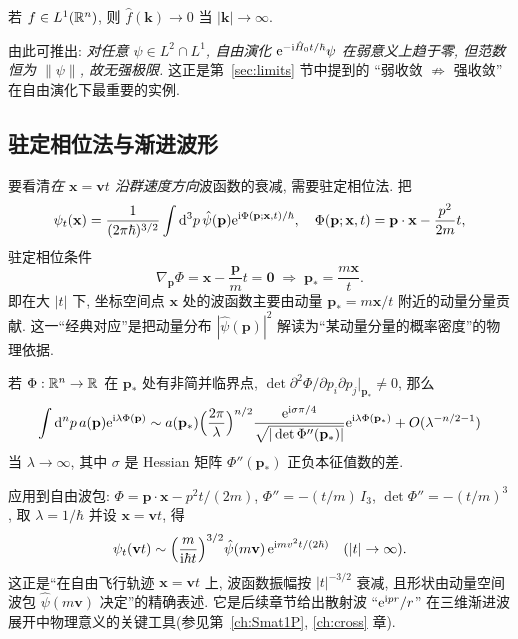 \begin{theorem}\label{thm:qm-riemann-lebesgue}
若 $f\in L^{1}(\mathbb{R}^{n})$, 则 $\hat f(\mathbf k)\to 0$ 当 $|\mathbf k|\to\infty$.
\end{theorem}

由此可推出: \emph{对任意 $\psi\in L^{2}\cap L^{1}$, 自由演化 $\mathrm{e}^{-\mathrm{i}\hat{H}_0 t/\hbar}\psi$ 在弱意义上趋于零, 但范数恒为 $\|\psi\|$, 故无强极限.} 这正是第~\ref{sec:limits} 节中提到的 ``弱收敛 $\not\Rightarrow$ 强收敛'' 在自由演化下最重要的实例.

\subsection{驻定相位法与渐进波形}\label{subsec:qm-stationary-phase}

要看清\emph{在 $\mathbf x=\mathbf v t$ 沿群速度方向}波函数的衰减, 需要驻定相位法. 把
\begin{equation}
\psi_{t}(\mathbf x)=\frac{1}{(2\pi\hbar)^{3/2}}\int\mathrm{d}^{3}p\,\hat\psi(\mathbf p)\mathrm{e}^{\mathrm{i}\Phi(\mathbf p;\mathbf x,t)/\hbar},\quad
\Phi(\mathbf p;\mathbf x,t)=\mathbf p\cdot\mathbf x-\frac{p^{2}}{2m}t,
\end{equation}
驻定相位条件
\begin{equation}\label{eq:qm-stationary-condition}
\nabla_{\mathbf p}\Phi=\mathbf x-\frac{\mathbf p}{m}t=\mathbf 0\;\Longrightarrow\;\mathbf p_{*}=\frac{m\mathbf x}{t}.
\end{equation}
即在大 $|t|$ 下, 坐标空间点 $\mathbf x$ 处的波函数主要由动量 $\mathbf p_{*}=m\mathbf x/t$ 附近的动量分量贡献. 这一``经典对应''是把动量分布 $|\hat\psi(\mathbf p)|^{2}$ 解读为``某动量分量的概率密度''的物理依据.

\begin{theorem}[驻定相位法, 多维]\label{thm:qm-stationary-phase}
若 $\Phi:\mathbb{R}^{n}\to\mathbb{R}$ 在 $\mathbf p_{*}$ 处有非简并临界点, $\det\partial^{2}\Phi/\partial p_i\partial p_j\big|_{\mathbf p_{*}}\neq 0$, 那么
\begin{equation}
\int\mathrm{d}^{n}p\,a(\mathbf p)\mathrm{e}^{\mathrm{i}\lambda\Phi(\mathbf p)}\sim
a(\mathbf p_{*})\Big(\frac{2\pi}{\lambda}\Big)^{n/2}\frac{\mathrm{e}^{\mathrm{i}\sigma\pi/4}}{\sqrt{|\det\Phi''(\mathbf p_{*})|}}\mathrm{e}^{\mathrm{i}\lambda\Phi(\mathbf p_{*})}+O(\lambda^{-n/2-1})
\end{equation}
当 $\lambda\to\infty$, 其中 $\sigma$ 是 Hessian 矩阵 $\Phi''(\mathbf p_{*})$ 正负本征值数的差.
\end{theorem}

应用到自由波包: $\Phi=\mathbf p\cdot\mathbf x-p^{2}t/(2m)$, $\Phi''=-(t/m)\,I_{3}$, $\det\Phi''=-(t/m)^{3}$, 取 $\lambda=1/\hbar$ 并设 $\mathbf x=\mathbf v t$, 得
\begin{equation}\label{eq:qm-asymp-wave}
\psi_{t}(\mathbf v t)\sim \Big(\frac{m}{\mathrm{i}\hbar t}\Big)^{3/2}\hat\psi(m\mathbf v)\,\mathrm{e}^{\mathrm{i} m v^{2} t/(2\hbar)}\quad (|t|\to\infty).
\end{equation}
这正是``在自由飞行轨迹 $\mathbf x=\mathbf v t$ 上, 波函数振幅按 $|t|^{-3/2}$ 衰减, 且形状由动量空间波包 $\hat\psi(m\mathbf v)$ 决定''的精确表述. 它是后续章节给出散射波 ``$\mathrm{e}^{\mathrm{i} p r}/r$'' 在三维渐进波展开中物理意义的关键工具(参见第~\ref{ch:Smat1P}, \ref{ch:cross} 章).

